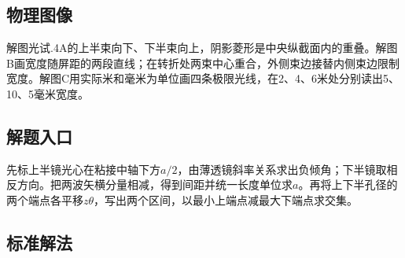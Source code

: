 \documentclass[UTF8,fontset=fandol,a4paper,11pt]{ctexart}
\begin{document}


\subsection*{物理图像}

解图光试.4A的上半束向下、下半束向上，阴影菱形是中央纵截面内的重叠。解图B画宽度随屏距的两段直线；在转折处两束中心重合，外侧束边接替内侧束边限制宽度。解图C用实际米和毫米为单位画四条极限光线，在2、4、6米处分别读出5、10、5毫米宽度。



\subsection*{解题入口}

先标上半镜光心在粘接中轴下方$a/2$，由薄透镜斜率关系求出负倾角；下半镜取相反方向。把两波矢横分量相减，得到间距并统一长度单位求$a$。再将上下半孔径的两个端点各平移$z\theta$，写出两个区间，以最小上端点减最大下端点求交集。



\subsection*{标准解法}
\end{document}
